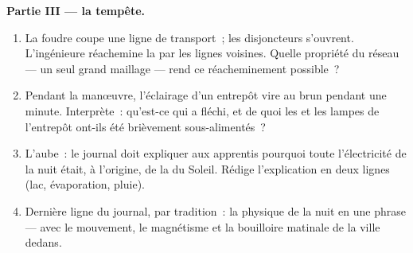 \begin{problem}
\medskip\noindent\textbf{Partie III --- la tempête.}
\begin{enumerate}[resume]
  \item La foudre coupe une ligne de transport~; les disjoncteurs
        s'ouvrent. L'ingénieure réachemine la  par les
        lignes voisines. Quelle propriété du réseau --- un seul
        grand maillage  --- rend ce réacheminement
        possible~?
  \item Pendant la manœuvre, l'éclairage d'un entrepôt vire au brun
        pendant une minute. Interprète~: qu'est-ce qui a fléchi, et
        de quoi les  et les lampes de l'entrepôt ont-ils été
        brièvement sous-alimentés~?
  \item L'aube~: le journal doit expliquer aux apprentis pourquoi
        toute l'électricité de la nuit était, à l'origine, de la
         du Soleil. Rédige l'explication en deux lignes
        (lac, évaporation, pluie).
  \item Dernière ligne du journal, par tradition~: la physique de
        la nuit en une phrase --- avec le mouvement, le magnétisme
        et la bouilloire matinale de la ville dedans.
\end{enumerate}
\end{problem}
